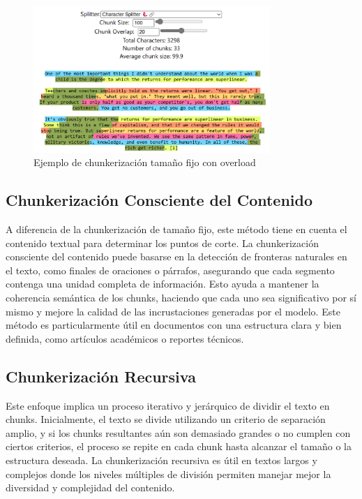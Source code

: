 \begin{figure}[h]
\centering
\includegraphics[width=0.8\textwidth]{figuras/capitulo4/character_splitter_100_20.png}
\caption{Ejemplo de chunkerización tamaño fijo con overload}
\label{fig:imagen_fijo_overload}
\end{figure}

\subsection{Chunkerización Consciente del Contenido}

A diferencia de la chunkerización de tamaño fijo, este método tiene en cuenta el contenido textual para determinar los puntos de corte. La chunkerización consciente del contenido puede basarse en la detección de fronteras naturales en el texto, como finales de oraciones o párrafos, asegurando que cada segmento contenga una unidad completa de información. Esto ayuda a mantener la coherencia semántica de los chunks, haciendo que cada uno sea significativo por sí mismo y mejore la calidad de las incrustaciones generadas por el modelo. Este método es particularmente útil en documentos con una estructura clara y bien definida, como artículos académicos o reportes técnicos.

\subsection{Chunkerización Recursiva}

Este enfoque implica un proceso iterativo y jerárquico de dividir el texto en chunks. Inicialmente, el texto se divide utilizando un criterio de separación amplio, y si los chunks resultantes aún son demasiado grandes o no cumplen con ciertos criterios, el proceso se repite en cada chunk hasta alcanzar el tamaño o la estructura deseada. La chunkerización recursiva es útil en textos largos y complejos donde los niveles múltiples de división permiten manejar mejor la diversidad y complejidad del contenido.

